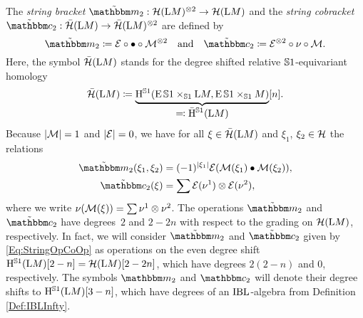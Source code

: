 \documentclass[\MainFolder/Text.tex]{subfiles}
\begin{document}
The \emph{string bracket} $\tilde{\StringOp}_2: \GeomStringH(\Loop M)^{\otimes 2}\rightarrow \GeomStringH(\Loop M)$ and the \emph{string cobracket} $\tilde{\StringCoOp}_2: \ConstRedGeomStringH(\Loop M) \rightarrow \ConstRedGeomStringH(\Loop M)^{\otimes 2}$ are defined by
$$ \tilde{\StringOp}_2 \coloneqq \Erase \circ \LoopPr \circ \Mark^{\otimes 2}\quad\text{and}\quad\tilde{\StringCoOp}_2 \coloneqq \Erase^{\otimes 2} \circ \nu \circ \Mark. $$
Here, the symbol $\bar{\mathcal{H}}(\mathrm{L} M)$ stands for the degree shifted relative $\mathbb{S}{1}$-equivariant homology
$$ \bar{\mathcal{H}}(\mathrm{L} M) \coloneqq \underbrace{\mathrm{H}^{\mathbb{S}{1}}(\operatorname{E} \mathbb{S}{1} \times_{\mathbb{S}{1}} \mathrm{L} M, \operatorname{E} \mathbb{S}{1} \times_{\mathbb{S}{1}} M)}_{\displaystyle \eqqcolon \bar{\mathrm{H}}^{\mathbb{S}{1}}(\mathrm{L} M)}[n]. $$
Because $|\mathcal{M}| = 1$ and $|\mathcal{E}| = 0$, we have for all $\xi \in \bar{\mathcal{H}}(\mathrm{L} M)$ and $\xi_1$, $\xi_2 \in \mathcal{H}$ the relations
\begin{equation}\label{Eq:StringOpCoOp}
\begin{aligned}
\tilde{\StringOp}_2(\xi_1,\xi_2) &= (-1)^{\Abs{\xi_1}} \Erase(\Mark(\xi_1)\LoopPr\Mark(\xi_2)), \\
\tilde{\StringCoOp}_2(\xi) & = \sum \Erase(\nu^{1}) \otimes \Erase(\nu^2),
\end{aligned}
\end{equation}
where we write $\nu(\mathcal{M}(\xi)) = \sum \nu^1 \otimes \nu^2$. The operations $\tilde{\StringOp}_2$ and $\tilde{\StringCoOp}_2$ have degrees~$2$ and $2-2n$ with respect to the grading on $\mathcal{H}(\mathrm{L} M)$, respectively. In fact, we will consider $\tilde{\StringOp}_2$ and $\tilde{\StringCoOp}_2$ given by \eqref{Eq:StringOpCoOp} as operations on the even degree shift $\mathrm{H}^{\mathbb{S}{1}}(\mathrm{L} M)[2-n] = \mathcal{H}(\mathrm{L} M)[2-2n]$, which have degrees $2(2-n)$ and $0$, respectively. The symbols $\StringOp_2$ and $\StringCoOp_2$ will denote their degree shifts to $\mathrm{H}^{\mathbb{S}{1}}(\mathrm{L} M)[3-n]$, which have degrees of an $\mathrm{IBL}$-algebra from Definition \ref{Def:IBLInfty}.
%
\end{document}
